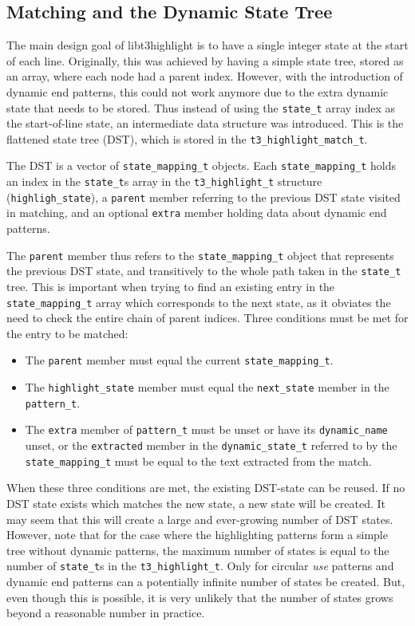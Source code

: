 \documentclass[a4paper]{article}
\begin{document}
\begin{multicols}{2}
\section{Matching and the Dynamic State Tree\label{sec:state-tree}}
The main design goal of libt3highlight is to have a single integer state at the
start of each line. Originally, this was achieved by having a simple state
tree, stored as an array, where each node had a parent index. However, with the
introduction of dynamic end patterns, this could not work anymore due to the
extra dynamic state that needs to be stored. Thus instead of using the
{\tt state_t} array index as the start-of-line state, an intermediate data
structure was introduced. This is the flattened state tree (DST), which is
stored in the {\tt t3_highlight_match_t}.

The DST is a vector of {\tt state_mapping_t} objects. Each
{\tt state_mapping_t} holds an index in the {\tt state_t}s array in the
{\tt t3_highlight_t} structure ({\tt highligh_state}), a {\tt parent} member
referring to the previous DST state visited in matching, and an optional
{\tt extra} member holding data about dynamic end patterns.

The {\tt parent} member thus refers to the {\tt state_mapping_t} object that
represents the previous DST state, and transitively to the whole path taken in
the {\tt state_t} tree. This is important when trying to find an existing entry
in the {\tt state_mapping_t} array which corresponds to the next state, as it
obviates the need to check the entire chain of parent indices. Three conditions
must be met for the entry to be matched:

\begin{itemize}
\item The {\tt parent} member must equal the current {\tt state_mapping_t}.
\item The {\tt highlight_state} member must equal the {\tt next_state} member
	in the {\tt pattern_t}.
\item The {\tt extra} member of {\tt pattern_t} must be unset or have its
	{\tt dynamic_name} unset, or the {\tt extracted} member in the
	{\tt dynamic_state_t} referred to by the {\tt state_mapping_t} must be
	equal to the text extracted from the match.
\end{itemize}

When these three conditions are met, the existing DST-state can be reused. If
no DST state exists which matches the new state, a new state will be created.
It may seem that this will create a large and ever-growing number of DST states.
However, note that for the case where the highlighting patterns form a simple
tree without dynamic patterns, the maximum number of states is equal to the
number of {\tt state_t}s in the {\tt t3_highlight_t}. Only for circular {\it use}
patterns and dynamic end patterns can a potentially infinite number of states
be created. But, even though this is possible, it is very unlikely that the
number of states grows beyond a reasonable number in practice.


\end{multicols}
\end{document}
